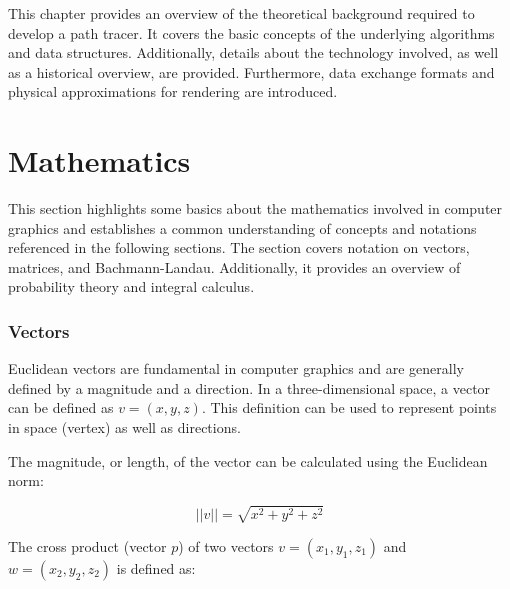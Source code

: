 \label{ch:theory}

This chapter provides an overview of the theoretical background required to develop a path tracer. It covers the basic concepts of the underlying algorithms and data structures. Additionally, details about the technology involved, as well as a historical overview, are provided. Furthermore, data exchange formats and physical approximations for rendering are introduced.

\section{Mathematics}

This section highlights some basics about the mathematics involved in computer graphics and establishes a common understanding of concepts and notations referenced in the following sections. The section covers notation on vectors, matrices, and Bachmann-Landau. Additionally, it provides an overview of probability theory and integral calculus.

\subsubsection{Vectors}

Euclidean vectors are fundamental in computer graphics and are generally defined by a magnitude and a direction. In a three-dimensional space, a vector can be defined as $v = (x, y, z)$. This definition can be used to represent points in space (vertex) as well as directions.

The magnitude, or length, of the vector can be calculated using the Euclidean norm:

\begin{equation}
  \label{eqn:euclidean-norm}
  ||v|| = \sqrt{x^2 + y^2 + z^2}
\end{equation}



The cross product (vector $p$) of two vectors $v = (x_1, y_1, z_1)$ and $w = (x_2, y_2, z_2)$ is defined as:

